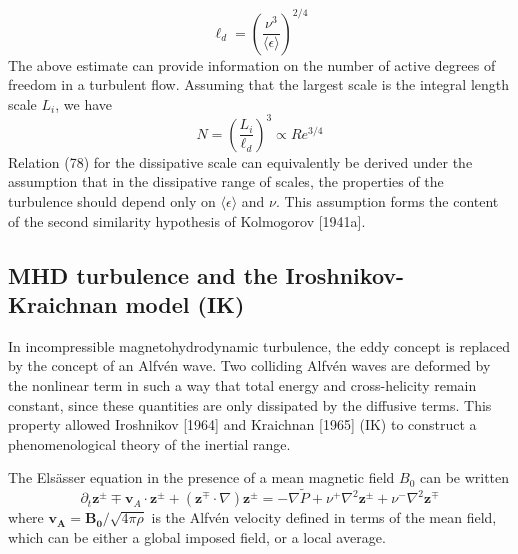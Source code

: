 \begin{equation}
    \ell_d=\left(\frac{\nu^3}{\langle\epsilon\rangle}\right)^{2/4}
\end{equation}
The above estimate can provide information on the number of active degrees of freedom in a turbulent flow. Assuming that the largest scale is the integral length scale $L_i$, we have
\begin{equation}
    N=\left(\frac{L_i}{\ell_d}\right)^3\propto Re^{3/4}
\end{equation}
Relation (78) for the dissipative scale can equivalently be derived under the assumption that in the dissipative range of scales, the properties of the turbulence should depend only on $\langle\epsilon\rangle$ and $\nu$. This assumption forms the content of the second similarity hypothesis of Kolmogorov [1941a].

\subsection{MHD turbulence and the Iroshnikov-Kraichnan model (IK)}
In incompressible magnetohydrodynamic turbulence, the eddy concept is replaced by the concept of an Alfv\'en wave. Two colliding Alfv\'en waves are deformed by the nonlinear term in such a way that total energy and cross-helicity remain constant, since these quantities are only dissipated by the diffusive terms.
This property allowed Iroshnikov [1964] and Kraichnan [1965] (IK) to construct a phenomenological theory of the inertial range. 

The Elsässer equation in the presence of a mean magnetic field $B_0$ can be written 
\begin{equation}
    \partial_t\mathbf{z}^\pm\mp\mathbf{v}_A\cdot\mathbf{z}^\pm+(\mathbf{z}^\mp\cdot\nabla)\mathbf{z}^\pm=-\nabla\tilde{P}+\nu^+\nabla^2\mathbf{z}^\pm+\nu^-\nabla^2\mathbf{z}^\mp
\end{equation}
where $\mathbf{v_A}=\mathbf{B_0}/\sqrt{4\pi\rho}$ is the Alfv\'en velocity defined in terms of the mean field, which can be either a global imposed field, or a local average. 

